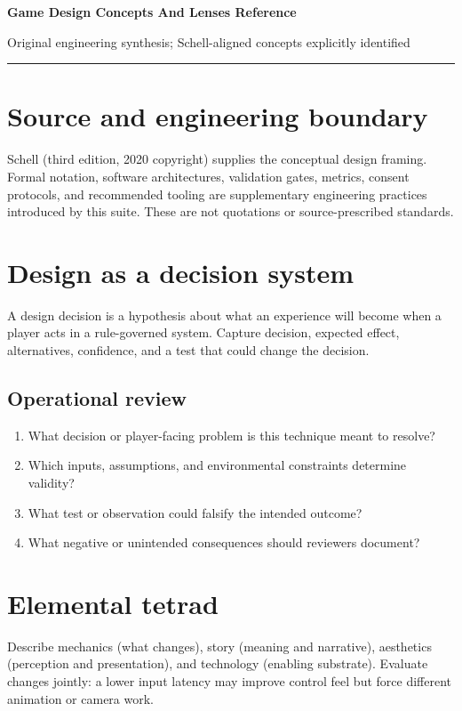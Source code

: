 \documentclass[11pt]{article}
\begin{document}
{\huge\bfseries\color{suiteblue} Game Design Concepts And Lenses Reference}\par
\vspace{0.15in}
{\normalsize\color{suitegray} Original engineering synthesis; Schell-aligned concepts explicitly identified}\par
\vspace{0.15in}\hrule\vspace{0.15in}

\section{Source and engineering boundary}
Schell (third edition, 2020 copyright) supplies the conceptual design framing. Formal notation, software architectures, validation gates, metrics, consent protocols, and recommended tooling are supplementary engineering practices introduced by this suite. These are not quotations or source-prescribed standards.


\section{Design as a decision system}
A design decision is a hypothesis about what an experience will become when a player acts in a rule-governed system. Capture decision, expected effect, alternatives, confidence, and a test that could change the decision.


\subsection{Operational review}
\begin{enumerate}
\item What decision or player-facing problem is this technique meant to resolve?
\item Which inputs, assumptions, and environmental constraints determine validity?
\item What test or observation could falsify the intended outcome?
\item What negative or unintended consequences should reviewers document?
\end{enumerate}

\section{Elemental tetrad}
Describe mechanics (what changes), story (meaning and narrative), aesthetics (perception and presentation), and technology (enabling substrate). Evaluate changes jointly: a lower input latency may improve control feel but force different animation or camera work.
\end{document}
